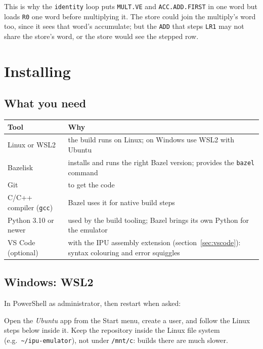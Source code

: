 \documentclass[11pt,a4paper]{article}
\begin{document}
This is why the \texttt{identity} loop puts \texttt{MULT.VE} and
\texttt{ACC.ADD.FIRST} in one word but loads \texttt{R0} one word before
multiplying it. The store could join the multiply's word too, since it sees
that word's accumulate; but the \texttt{ADD} that steps \texttt{LR1} may not
share the store's word, or the store would see the stepped row.

\section{Installing}

\subsection{What you need}

\begin{center}
\begin{tabularx}{\linewidth}{lX}
\toprule
Tool & Why \\
\midrule
Linux or WSL2 & the build runs on Linux; on Windows use WSL2 with Ubuntu \\
Bazelisk & installs and runs the right Bazel version; provides the \texttt{bazel} command \\
Git & to get the code \\
C/C++ compiler (\texttt{gcc}) & Bazel uses it for native build steps \\
Python 3.10 or newer & used by the build tooling; Bazel brings its own Python for the emulator \\
VS Code (optional) & with the IPU assembly extension (section~\ref{sec:vscode}): syntax colouring and error squiggles \\
\bottomrule
\end{tabularx}
\end{center}

\subsection{Windows: WSL2}

In PowerShell as administrator, then restart when asked:


Open the \emph{Ubuntu} app from the Start menu, create a user, and follow the
Linux steps below inside it. Keep the repository inside the Linux file system
(e.g.\ \texttt{\textasciitilde/ipu-emulator}), not under \texttt{/mnt/c}: builds
there are much slower.
\end{document}
